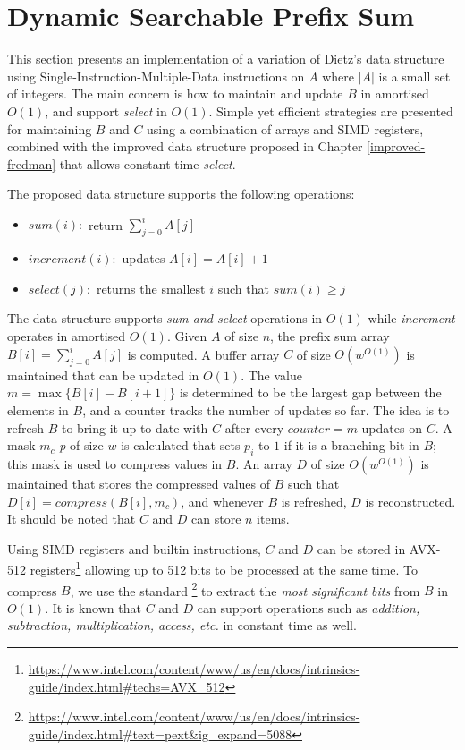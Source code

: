 \section{Dynamic Searchable Prefix Sum}
This section presents an implementation of a variation of Dietz's \cite{Dietz_1989} data structure using Single-Instruction-Multiple-Data instructions on $A$ where $|A|$ is a small set of integers. The main concern is how to maintain and update $B$ in amortised $O(1)$, and support \textit{select} in $O(1)$. Simple yet efficient strategies are presented for maintaining $B$ and $C$ using a combination of arrays and SIMD registers, combined with the improved data structure proposed in Chapter \ref{improved-fredman} that allows constant time \textit{select}.\par
The proposed data structure supports the following operations:
\begin{itemize}
    \item $sum(i):$ return $\sum_{j=0}^{i} A[j]$
    \item $increment(i):$ updates $A[i] = A[i] + 1$
    \item $select(j):$ returns the smallest $i$ such that $sum(i) \geq j$
\end{itemize}
The data structure supports \textit{sum and select} operations in $O(1)$ while \textit{increment} operates in amortised $O(1)$. Given $A$ of size $n$, the prefix sum array $B[i] = \sum_{j=0}^{i} A[j]$ is computed. A buffer array $C$ of size $O(w^{O(1)})$ is maintained that can be updated in $O(1)$. The value $m = \max\{B[i] - B[i+1]\}$ is determined to be the largest gap between the elements in $B$, and a counter tracks the number of updates so far. The idea is to refresh $B$ to bring it up to date with $C$ after every $counter = m$ updates on $C$. A mask $m_c$ \textit{p} of size $w$ is calculated that sets $p_i$ to $1$ if it is a branching bit in $B$; this mask is used to compress values in $B$. An array $D$ of size $O(w^{O(1)})$ is maintained that stores the compressed values of $B$ such that $D[i] = compress(B[i], m_c)$, and whenever $B$ is refreshed, $D$ is reconstructed. It should be noted that $C$ and $D$ can store $n$ items.\par
Using SIMD registers and builtin instructions, $C$ and $D$ can be stored in AVX-512 registers\footnote{\url{https://www.intel.com/content/www/us/en/docs/intrinsics-guide/index.html\#techs=AVX\_512}} allowing up to 512 bits to be processed at the same time. To compress $B$, we use the standard \footnote{\url{https://www.intel.com/content/www/us/en/docs/intrinsics-guide/index.html\#text=pext\&ig\_expand=5088}} to extract the \textit{most significant bits} from $B$ in $O(1)$. It is known that $C$ and $D$ can support operations such as \textit{addition, subtraction, multiplication, access, etc.} in constant time as well.\par
